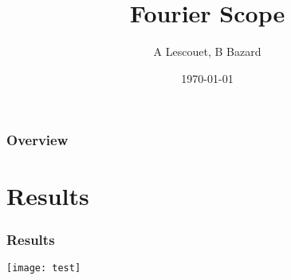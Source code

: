 \documentclass{beamer}
\title[Fourier Scope]{Fourier Scope}
\author{A Lescouet, B Bazard}
\institute[Télécom SudParis]{
  Télécom Sudparis\\
}
\date{\today}
\begin{document}
\begin{frame}
  \titlepage%
\end{frame}

\begin{frame}%
  \frametitle{Overview}
  \tableofcontents
\end{frame}

\section{Results}

\begin{frame}
  \frametitle{Results}
  \begin{center}
    \texttt{[image: test]}%
  \end{center}
\end{frame}
\end{document}
